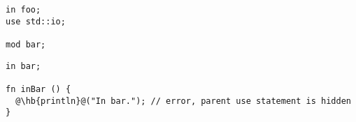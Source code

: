 \hspace{-0.03\linewidth}%
\begin{minipage}[t][][t]{0.3\linewidth}%
\begin{lstlisting}[caption=\textit{./foo.yr}, style=coloredverbatim]
in foo;
use std::io;

mod bar;
\end{lstlisting}
\end{minipage}%
\hspace{0.02\linewidth}%
\begin{minipage}[t][][t]{0.65\linewidth}
\begin{lstlisting}[caption=\textit{./foo/bar.yr}, style=coloredverbatim, escapechar=@]
in bar;

fn inBar () {
  @\hb{println}@("In bar."); // error, parent use statement is hidden
}
\end{lstlisting}
\end{minipage}%

\vfill%
\pagebreak
